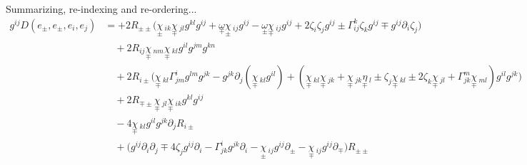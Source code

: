 \documentclass[a4paper,11pt]{article}
\begin{document}
Summarizing, re-indexing and re-ordering...
\begin{align*}
    g^{ij} D(e_\pm,e_\pm,e_i,e_j)
    &= 
    + 2 R_{\pm\pm} \Big( \underset{\pm}{\chi}\,_{ik} \underset{\mp}{\chi}\,_{jl}g^{kl}g^{ij}
    + \underset{\mp}{\omega} \underset{\pm}{\chi}\,_{ij}g^{ij}
    - \underset{\pm}{\omega} \underset{\mp}{\chi}\,_{ij}g^{ij}
    + 2 \zeta_i \zeta_jg^{ij}
    \pm \Gamma_{ij}^k \zeta_k g^{ij}
    \mp g^{ij} \partial_i\zeta_j \Big)\\
    &\quad 
    + 2 R_{ij} \underset{\mp}{\chi}\,_{nm} \underset{\mp}{\chi}\,_{kl}g^{il}g^{jm}g^{kn} \\
    &\quad 
    + 2 R_{i\pm} \Big( \underset{\mp}{\chi}\,_{kl}\Gamma_{jm}^i g^{lm} g^{jk}
    \!-\! g^{jk} \partial_j(\underset{\mp}{\chi}\,_{kl}g^{il})
    \!+\! (\underset{\mp}{\chi}\,_{kl} \underset{\mp}{\chi}\,_{jk}
    \!+\! \underset{\mp}{\chi}\,_{jk} \underset{\mp}{\eta}\,_l
    \!\pm\! \zeta_j \underset{\mp}{\chi}\,_{kl}
    \!\pm\! 2 \zeta_k \underset{\mp}{\chi}\,_{jl}
    \!+\! \Gamma_{jk}^m \underset{\mp}{\chi}\,_{ml} )g^{il} g^{jk}\Big) \\
    &\quad 
    + 2 R_{\mp\pm} \underset{\mp}{\chi}\,_{jl} \underset{\mp}{\chi}\,_{ik} g^{kl} g^{ij}\\
    &\quad 
    - 4 \underset{\mp}{\chi}\,_{kl}g^{il}  g^{jk} \partial_j R_{i \pm}\\
    &\quad 
    +  \Big( g^{ij}\partial_i \partial_j
    \mp 4 \zeta_j g^{ij}\partial_i
    -\Gamma_{jk}^i g^{jk}\partial_i
    -\underset{\pm}{\chi}\,_{ij} g^{ij} \partial_\pm
    -\underset{\mp}{\chi}\,_{ij} g^{ij} \partial_\mp \Big) R_{\pm\pm}
\end{align*}
\end{document}
